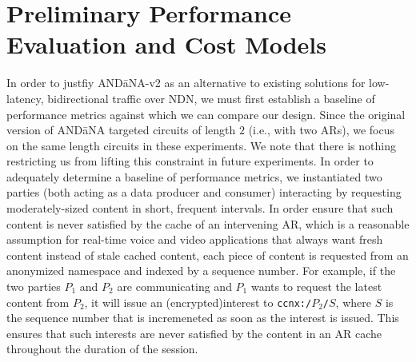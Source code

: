 \documentclass[10pt]{article}
\begin{document}
\section{Preliminary Performance Evaluation and Cost Models}
In order to justfiy {\sf AND\=aNA-v2} as an alternative to existing solutions for low-latency, bidirectional traffic over NDN, we must first establish a baseline of performance metrics against which we can compare our design. Since the original version of {\sf AND\=aNA} targeted circuits of length $2$ (i.e., with two ARs), we focus on the same length circuits in these experiments. We note that there is nothing restricting us from lifting this constraint in future experiments. In order to adequately determine a baseline of performance metrics, we instantiated two parties (both acting as a data producer and consumer) interacting by requesting moderately-sized content in short, frequent intervals. In order ensure that such content is never satisfied by the cache of an intervening AR, which is a reasonable assumption for real-time voice and video applications that always want fresh content instead of stale cached content, each piece of content is requested from an anonymized namespace and indexed by a sequence number. For example, if the two parties $P_1$ and $P_2$ are communicating and $P_1$ wants to request the latest content from $P_2$, it will issue an (encrypted)interest to {\tt ccnx:/$P_2$/$S$}, where $S$ is the sequence number that is incremeneted as soon as the interest is issued. This ensures that such interests are never satisfied by the content in an AR cache throughout the duration of the session. 
\end{document}
